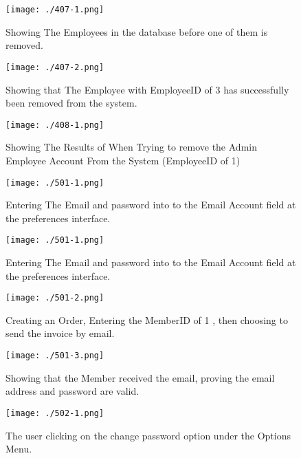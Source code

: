 \begin{figure}[H]
    \texttt{[image: ./407-1.png]}
    \caption{Showing The Employees in the database before one of them is removed.} \label{fig:407-1}
\end{figure}

\begin{figure}[H]
    \texttt{[image: ./407-2.png]}
    \caption{Showing that The Employee with EmployeeID of 3 has successfully been removed from the system.} \label{fig:407-2}
\end{figure}

\begin{figure}[H]
    \texttt{[image: ./408-1.png]}
    \caption{Showing The Results of When Trying to remove the Admin Employee Account From the System (EmployeeID of 1)} \label{fig:408-1}
\end{figure}

\begin{figure}[H]
    \texttt{[image: ./501-1.png]}
    \caption{Entering The Email and password into to the Email Account field at the preferences interface.} \label{fig:501-1}
\end{figure}

\begin{figure}[H]
    \texttt{[image: ./501-1.png]}
    \caption{Entering The Email and password into to the Email Account field at the preferences interface.} \label{fig:501-1}
\end{figure}

\begin{figure}[H]
    \texttt{[image: ./501-2.png]}
    \caption{Creating an Order, Entering the MemberID of 1 , then choosing to send the invoice by email.} \label{fig:501-2}
\end{figure}

\begin{figure}[H]
    \texttt{[image: ./501-3.png]}
    \caption{Showing that the Member received the email, proving the email address and password are valid.} \label{fig:501-3}
\end{figure}

\begin{figure}[H]
    \texttt{[image: ./502-1.png]}
    \caption{ The user clicking on the change password option under the Options Menu. } \label{fig:502-1}
\end{figure}

